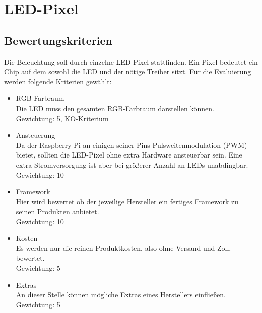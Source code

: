 \documentclass[12pt,a4paper]{scrreprt}
\begin{document}
\section{LED-Pixel}
\subsection{Bewertungskriterien}
Die Beleuchtung soll durch einzelne LED-Pixel stattfinden. Ein Pixel bedeutet ein Chip auf dem sowohl die LED und der nötige Treiber sitzt. Für die Evaluierung werden folgende Kriterien gewählt:
\begin{itemize}
\item RGB-Farbraum \\
Die LED muss den gesamten RGB-Farbraum darstellen können. \\
Gewichtung: 5, KO-Kriterium
\item Ansteuerung \\
Da der Raspberry Pi an einigen seiner Pins Pulsweitenmodulation (PWM) bietet, sollten die LED-Pixel ohne extra Hardware ansteuerbar sein. Eine extra Stromversorgung ist aber bei größerer Anzahl an LEDs unabdingbar. \\
Gewichtung: 10
\item Framework \\
Hier wird bewertet ob der jeweilige Hersteller ein fertiges Framework zu seinen Produkten anbietet. \\
Gewichtung: 10
\item Kosten \\
Es werden nur die reinen Produktkosten, also ohne Versand und Zoll, bewertet. \\
Gewichtung: 5
\item Extras \\
An dieser Stelle können mögliche Extras eines Herstellers einfließen. \\
Gewichtung: 5
\end{itemize}
\end{document}
